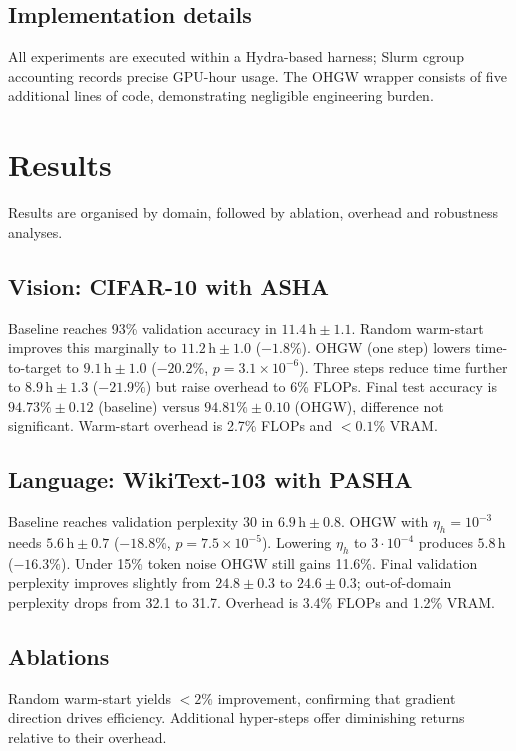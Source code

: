 \documentclass{article} %
\begin{document}
\subsection{Implementation details}
All experiments are executed within a Hydra-based harness; Slurm cgroup accounting records precise GPU-hour usage. The OHGW wrapper consists of five additional lines of code, demonstrating negligible engineering burden.

\section{Results}
\label{sec:results}
Results are organised by domain, followed by ablation, overhead and robustness analyses.

\subsection{Vision: CIFAR-10 with ASHA}
Baseline reaches 93\% validation accuracy in \(11.4\,\text{h} \pm 1.1\). Random warm-start improves this marginally to \(11.2\,\text{h} \pm 1.0\) (\(-1.8\%\)). OHGW (one step) lowers time-to-target to \(9.1\,\text{h} \pm 1.0\) (\(-20.2\%\), \(p = 3.1 \times 10^{-6}\)). Three steps reduce time further to \(8.9\,\text{h} \pm 1.3\) (\(-21.9\%\)) but raise overhead to 6\% FLOPs. Final test accuracy is \(94.73\% \pm 0.12\) (baseline) versus \(94.81\% \pm 0.10\) (OHGW), difference not significant. Warm-start overhead is 2.7\% FLOPs and \(<0.1\%\) VRAM.

\subsection{Language: WikiText-103 with PASHA}
Baseline reaches validation perplexity 30 in \(6.9\,\text{h} \pm 0.8\). OHGW with \(\eta_h = 10^{-3}\) needs \(5.6\,\text{h} \pm 0.7\) (\(-18.8\%\), \(p = 7.5 \times 10^{-5}\)). Lowering \(\eta_h\) to \(3\cdot10^{-4}\) produces \(5.8\,\text{h}\) (\(-16.3\%\)). Under 15\% token noise OHGW still gains 11.6\%. Final validation perplexity improves slightly from \(24.8 \pm 0.3\) to \(24.6 \pm 0.3\); out-of-domain perplexity drops from 32.1 to 31.7. Overhead is 3.4\% FLOPs and 1.2\% VRAM.

\subsection{Ablations}
Random warm-start yields \(<2\%\) improvement, confirming that gradient direction drives efficiency. Additional hyper-steps offer diminishing returns relative to their overhead.
\end{document}

